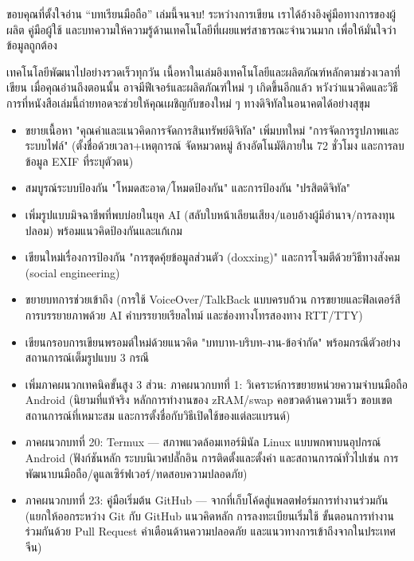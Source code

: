 
ขอบคุณที่ตั้งใจอ่าน “บทเรียนมือถือ” เล่มนี้จนจบ! ระหว่างการเขียน เราได้อ้างอิงคู่มือทางการของผู้ผลิต คู่มือผู้ใช้ และบทความให้ความรู้ด้านเทคโนโลยีที่เผยแพร่สาธารณะจำนวนมาก เพื่อให้มั่นใจว่าข้อมูลถูกต้อง

เทคโนโลยีพัฒนาไปอย่างรวดเร็วทุกวัน เนื้อหาในเล่มอิงเทคโนโลยีและผลิตภัณฑ์หลักตามช่วงเวลาที่เขียน เมื่อคุณอ่านถึงตอนนั้น อาจมีฟีเจอร์และผลิตภัณฑ์ใหม่ ๆ เกิดขึ้นอีกแล้ว หวังว่าแนวคิดและวิธีการที่หนังสือเล่มนี้ถ่ายทอดจะช่วยให้คุณเผชิญกับของใหม่ ๆ ทางดิจิทัลในอนาคตได้อย่างสุขุม


\begin{itemize}
  \item ขยายเนื้อหา "คุณค่าและแนวคิดการจัดการสินทรัพย์ดิจิทัล" เพิ่มบทใหม่ "การจัดการรูปภาพและระบบไฟล์" (ตั้งชื่อด้วยเวลา+เหตุการณ์ จัดหมวดหมู่ ล้างอัตโนมัติภายใน 72 ชั่วโมง และการลบข้อมูล EXIF ที่ระบุตัวตน)
  \item สมบูรณ์ระบบป้องกัน "โหมดสะอาด/โหมดป้องกัน" และการป้องกัน "ปรสิตดิจิทัล"
  \item เพิ่มรูปแบบมิจฉาชีพที่พบบ่อยในยุค AI (สลับใบหน้าเลียนเสียง/แอบอ้างผู้มีอำนาจ/การลงทุนปลอม) พร้อมแนวคิดป้องกันและแก้เกม
  \item เขียนใหม่เรื่องการป้องกัน "การขุดคุ้ยข้อมูลส่วนตัว (doxxing)" และการโจมตีด้วยวิธีทางสังคม (social engineering)
  \item ขยายบทการช่วยเข้าถึง (การใช้ VoiceOver/TalkBack แบบครบถ้วน การขยายและฟิลเตอร์สี การบรรยายภาพด้วย AI คำบรรยายเรียลไทม์ และช่องทางโทรสองทาง RTT/TTY)
  \item เขียนกรอบการเขียนพรอมต์ใหม่ด้วยแนวคิด "บทบาท-บริบท-งาน-ข้อจำกัด" พร้อมกรณีตัวอย่างสถานการณ์เต็มรูปแบบ 3 กรณี
  \item เพิ่มภาคผนวกเทคนิคขั้นสูง 3 ส่วน: ภาคผนวกบทที่ 1: วิเคราะห์การขยายหน่วยความจำบนมือถือ Android (นิยามที่แท้จริง หลักการทำงานของ zRAM/swap คอขวดด้านความเร็ว ขอบเขตสถานการณ์ที่เหมาะสม และการตั้งชื่อกับวิธีเปิดใช้ของแต่ละแบรนด์)
  \item ภาคผนวกบทที่ 20: Termux — สภาพแวดล้อมเทอร์มินัล Linux แบบพกพาบนอุปกรณ์ Android (ฟังก์ชันหลัก ระบบนิเวศปลั๊กอิน การติดตั้งและตั้งค่า และสถานการณ์ทั่วไปเช่น การพัฒนาบนมือถือ/ดูแลเซิร์ฟเวอร์/ทดสอบความปลอดภัย)
  \item ภาคผนวกบทที่ 23: คู่มือเริ่มต้น GitHub — จากที่เก็บโค้ดสู่แพลตฟอร์มการทำงานร่วมกัน (แยกให้ออกระหว่าง Git กับ GitHub แนวคิดหลัก การลงทะเบียนเริ่มใช้ ขั้นตอนการทำงานร่วมกันด้วย Pull Request คำเตือนด้านความปลอดภัย และแนวทางการเข้าถึงจากในประเทศจีน)
\end{itemize}

